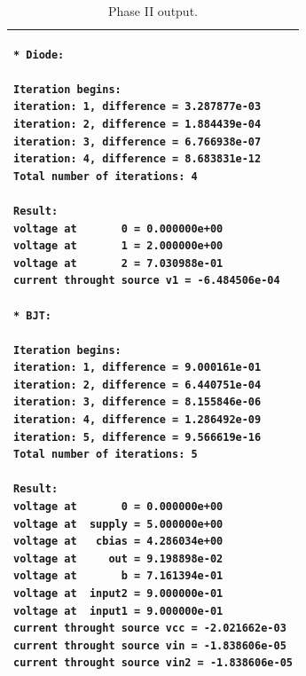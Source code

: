 \documentclass[12pt]{article}
\begin{document}
\begin{table}[h]
  \centering
\begin{tabular}{|p{\linewidth}|}
\hline
\scriptsize
\begin{verbatim}
* Diode:

Iteration begins:
iteration: 1, difference = 3.287877e-03
iteration: 2, difference = 1.884439e-04
iteration: 3, difference = 6.766938e-07
iteration: 4, difference = 8.683831e-12
Total number of iterations: 4

Result:
voltage at       0 = 0.000000e+00
voltage at       1 = 2.000000e+00
voltage at       2 = 7.030988e-01
current throught source v1 = -6.484506e-04

* BJT:

Iteration begins:
iteration: 1, difference = 9.000161e-01
iteration: 2, difference = 6.440751e-04
iteration: 3, difference = 8.155846e-06
iteration: 4, difference = 1.286492e-09
iteration: 5, difference = 9.566619e-16
Total number of iterations: 5

Result:
voltage at       0 = 0.000000e+00
voltage at  supply = 5.000000e+00
voltage at   cbias = 4.286034e+00
voltage at     out = 9.198898e-02
voltage at       b = 7.161394e-01
voltage at  input2 = 9.000000e-01
voltage at  input1 = 9.000000e-01
current throught source vcc = -2.021662e-03
current throught source vin = -1.838606e-05
current throught source vin2 = -1.838606e-05
\end{verbatim}\\
\hline
\end{tabular}
  \caption{Phase II output.}
  \label{tab:phase2}
\end{table}




\end{document}
